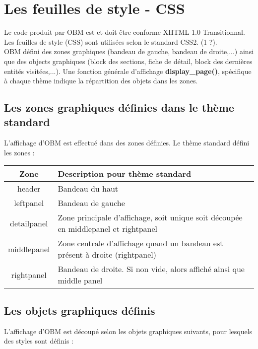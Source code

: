 
\section{Les feuilles de style - CSS}
\label{display}

Le code produit par OBM est et doit être conforme XHTML 1.0 Transitionnal.
Les feuilles de style (CSS) sont utilisées selon le standard CSS2. (1 ?).\\

OBM défini des zones graphiques (bandeau de gauche, bandeau de droite,...) ainsi que des objects graphiques (block des sections, fiche de détail, block des dernières entités visitées,...). Une fonction générale d'affichage \textbf{display\_page()}, spécifique à chaque thème indique la répartition des objets dans les zones.

\subsection{Les zones graphiques définies dans le thème standard}

L'affichage d'OBM est effectué dans des zones définies.
Le thème standard défini les zones :\\

\begin{tabular}{|c|l|}
\hline
\textbf{Zone} & \textbf{Description pour thème standard}\\
\hline
header & Bandeau du haut \\
\hline
leftpanel & Bandeau de gauche \\
\hline
detailpanel & Zone principale d'affichage, soit unique soit découpée en middlepanel et rightpanel\\
\hline
middlepanel & Zone centrale d'affichage quand un bandeau est présent à droite (rightpanel)\\
\hline
rightpanel & Bandeau de droite. Si non vide, alors affiché ainsi que middle panel\\
\hline
\end{tabular}

\subsection{Les objets graphiques définis}

L'affichage d'OBM est découpé selon les objets graphiques suivants, pour lesquels des styles sont définis :\\

